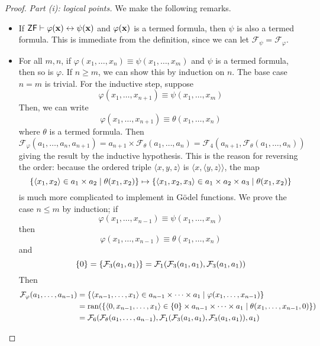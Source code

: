\begin{proof}
    \emph{Part (i): logical points.}
    We make the following remarks.
    \begin{itemize}
        \item If \( \mathsf{ZF} \vdash \varphi(\vb x) \leftrightarrow \psi(\vb x) \) and \( \varphi(\vb x) \) is a termed formula, then \( \psi \) is also a termed formula.
        This is immediate from the definition, since we can let \( \mathcal F_\psi = \mathcal F_\varphi \).
        \item For all \( m, n \), if \( \varphi(x_1, \dots, x_n) \equiv \psi(x_1, \dots, x_m) \) and \( \psi \) is a termed formula, then so is \( \varphi \).
        If \( n \geq m \), we can show this by induction on \( n \).
        The base case \( n = m \) is trivial.
        For the inductive step, suppose
        \[ \varphi(x_1, \dots, x_{n+1}) \equiv \psi(x_1, \dots, x_m) \]
        Then, we can write
        \[ \varphi(x_1, \dots, x_{n+1}) \equiv \theta(x_1, \dots, x_n) \]
        where \( \theta \) is a termed formula.
        Then
        \[ \mathcal F_\varphi(a_1, \dots, a_n, a_{n+1}) = a_{n+1} \times \mathcal F_\theta(a_1, \dots, a_n) = \mathcal F_4(a_{n+1}, \mathcal F_\theta(a_1, \dots, a_n)) \]
        giving the result by the inductive hypothesis.
        This is the reason for reversing the order: because the ordered triple \( \langle x, y, z \rangle \) is \( \langle x, \langle y, z \rangle \rangle \), the map
        \[ \qty{\langle x_1, x_2 \rangle \in a_1 \times a_2 \mid \theta(x_1, x_2)} \mapsto \qty{\langle x_1, x_2, x_3 \rangle \in a_1 \times a_2 \times a_3 \mid \theta(x_1, x_2)} \]
        is much more complicated to implement in G\"odel functions.
        We prove the case \( n \leq m \) by induction; if
        \[ \varphi(x_1, \dots, x_{n-1}) \equiv \psi(x_1, \dots, x_m) \]
        then
        \[ \varphi(x_1, \dots, x_{n-1}) \equiv \theta(x_1, \dots, x_n) \]
        and
        \[ \qty{0} = \qty{\mathcal F_3(a_1, a_1)} = \mathcal F_1(\mathcal F_3(a_1, a_1), \mathcal F_3(a_1, a_1)) \]
        Then
        \begin{align*}
            \mathcal F_\varphi(a_1, \dots, a_{n-1}) &= \qty{\langle x_{n-1}, \dots, x_1 \rangle \in a_{n-1} \times \dots \times a_1 \mid \varphi(x_1, \dots, x_{n-1})} \\
            &= \ran(\qty{\langle 0, x_{n-1}, \dots, x_1 \rangle \in \qty{0} \times a_{n-1} \times \dots \times a_1 \mid \theta(x_1, \dots, x_{n-1}, 0)}) \\
            &= \mathcal F_6(\mathcal F_\theta(a_1, \dots, a_{n-1}), \mathcal F_1(\mathcal F_3(a_1, a_1), \mathcal F_3(a_1, a_1)), a_1)

\end{align*}
\end{itemize}
\end{proof}
